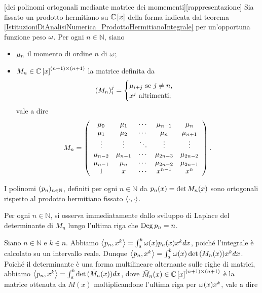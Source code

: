 \begin{Theorem}
	[dei polinomi ortogonali mediante matrice dei momementi][rappresentazione]
	Sia fissato un prodotto hermitiano su $\mathbb{C} \left [ x \right ]$ della forma indicata dal teorema \ref{IstituzioniDiAnalisiNumerica_ProdottoHermitianoIntegrale} per un'opportuna funzione peso $\omega$. Per ogni $n \in \mathbb{N}$, siano
	\begin{itemize}
		\item $\mu_n$ il momento di ordine $n$ di $\omega$;
		\item $M_n \in \mathbb{C} \left [ x \right ]^{(n + 1) \times (n + 1)}$ la matrice definita da
		\[
			(M_n)_i^j =
			\begin{cases}
				\mu_{i + j}\text{ se }j \neq n,\\ 
				x^j\text{ altrimenti;}
			\end{cases}
		\]
		vale a dire
		\[
			M_n = 
			\left (
			\begin{array}{ccccc}
				\mu_0 & \mu_1 & \cdots & \mu_{n - 1} & \mu_n\\
				\mu_1 & \mu_2 & \cdots & \mu_n & \mu_{n+1}\\
				\vdots & \vdots & \ddots & \vdots & \vdots\\
				\mu_{n - 2} & \mu_{n - 1} & \cdots & \mu_{2n - 3} & \mu_{2n-2}\\
				\mu_{n - 1} & \mu_n & \cdots & \mu_{2n - 2} & \mu_{2n-1}\\
				1 & x & \cdots & x^{n - 1} & x^n
			\end{array}
			\right ).
		\]
	\end{itemize}
	I polinomi $(p_n)_{n \in \mathbb{N}}$, definiti per ogni $n \in \mathbb{N}$ da $p_n(x) = \operatorname{det}{M_n(x)}$ sono ortogonali rispetto al prodotto hermitiano fissato $\left \langle \cdot , \cdot \right \rangle$.
\end{Theorem}
\Proof Per ogni $n \in \mathbb{N}$, si osserva immediatamente dallo sviluppo di Laplace del determinante di $M_n$ lungo l'ultima riga che $\operatorname{\operatorname{Deg}}{p_n} = n$.
\par Siano $n \in \mathbb{N}$ e $k \in n$. Abbiamo $\left \langle p_n , x^k \right \rangle = \int_a^b \omega(x) p_n(x) x^k dx$, poich\'e l'integrale \`e calcolato su un intervallo reale. Dunque $\left \langle p_n , x^k \right \rangle = \int_a^b \omega(x) \operatorname{det}{(M_n(x))} x^k dx$. Poich\'e il determinante \`e una forma multilineare alternante sulle righe di matrici, abbiamo $\left \langle p_n , x^k \right \rangle = \int_a^b \operatorname{det}{(\bar{M}_n(x))} dx$, dove $\bar{M}_n(x) \in \mathbb{C} \left [ x \right ]^{(n + 1) \times (n + 1)}$ \`e la matrice ottenuta da $M(x)$ moltiplicandone l'ultima riga per $\omega(x) x^k$, vale a dire
